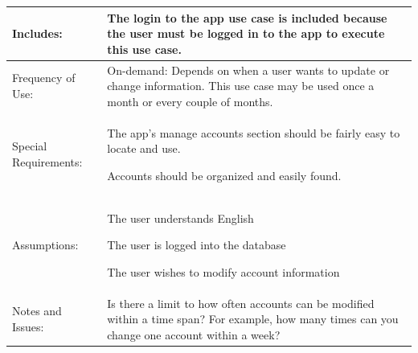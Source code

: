 \documentclass[stu]{apa7}
\newcommand{\nextitem}{\par\hspace*{\labelsep}\textbullet\hspace*{\labelsep}}
\begin{document}
{\begin{xltabular}{\textwidth}{|l|X|}
              Includes: & The login to the app use case is included because the user must be logged in to the app to execute this use case. \\ \hline

              Frequency of Use: & On-demand: Depends on when a user wants to update or change information. This use case may be used once a month or every couple of months. \\ \hline

              Special Requirements: & \nextitem The app’s manage accounts section should be fairly easy to locate and use.
                                      \nextitem Accounts should be organized and easily found. \\ \hline

              Assumptions: & \nextitem The user understands English
                             \nextitem The user is logged into the database
                             \nextitem The user wishes to modify account information \\ \hline

              Notes and Issues: & \nextitem Is there a limit to how often accounts can be modified within a time span? For example, how many times can you change one account within a week?\\ \hline

\end{xltabular}}

%
%
%
%
%
%
%
%
%
%
%
%
%
%
%
%
%
\end{document}
